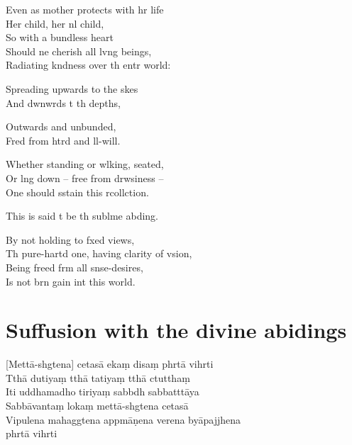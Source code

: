 Even as  mother protects with hr life\\
Her child, her nl child,\\
So with a bundless heart\\
Should ne cherish all lvng beings,\\
Radiating kndness over th entr world:

Spreading upwards to the skes\\
And dwnwrds t th depths,

Outwards and unbunded,\\
Fred from htrd and ll-will.

Whether standing or wlking, seated, \\
Or lng down -- free from drwsiness --\\
One should sstain this rcollction.

This is said t be th sublme abding.

By not holding to fxed views,\\
Th pure-hartd one, having clarity of vsion,\\
Being freed frm all snse-desires,\\
Is not brn gain int this world.

\chapter[Divine abidings]{Suffusion with the divine abidings}

\begin{leader}
\end{leader}

[Mettā-shgtena] cetasā ekaṃ disaṃ phrtā vihrti\\
Tthā dutiyaṃ tthā tatiyaṃ tthā ctutthaṃ\\
Iti uddhamadho tiriyaṃ sabbdh sabbatttāya\\
Sabbāvantaṃ lokaṃ mettā-shgtena cetasā\\
Vipulena mahaggtena appmāṇena verena byāpajjhena\\
phrtā vihrti

